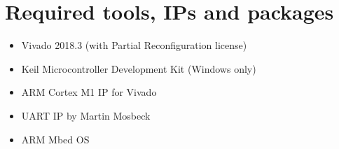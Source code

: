 \section{Required tools, \glspl{IP} and packages}

\begin{itemize}
    \item Vivado 2018.3 (with Partial Reconfiguration license)
    \item Keil Microcontroller Development Kit (Windows only)
    \item ARM Cortex M1 IP for Vivado
    \item UART IP by Martin Mosbeck
    \item ARM Mbed OS
\end{itemize}
